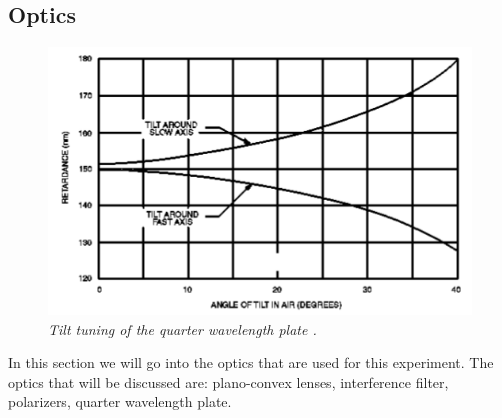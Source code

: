 \documentclass[twocolumn]{article}
\begin{document}
\subsection{Optics}
\begin{figure}
\begin{minipage}[t]{\textwidth}
\center
\includegraphics[width=0.6\linewidth]{pictures/quarter-wave.png}
\caption{\textit{Tilt tuning of the quarter wavelength plate \cite{ref:3}.}}
\label{fig:15}
\end{minipage}
\end{figure}
In this section we will go into the optics that are used for this experiment. 
The optics that will be discussed are: plano-convex lenses, 
interference filter, polarizers, quarter wavelength plate.
\end{document}
